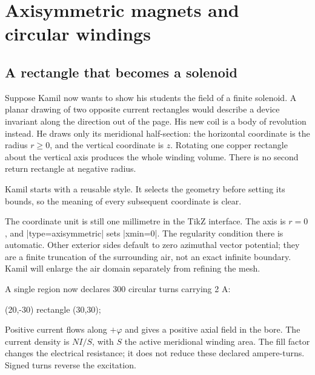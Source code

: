 \section{Axisymmetric magnets and circular windings}
\label{sec:axisymmetric}

\subsection{A rectangle that becomes a solenoid}
Suppose Kamil now wants to show his students the field of a finite solenoid.
A planar drawing of two opposite current rectangles would describe a device
invariant along the direction out of the page. His new coil is a body of
revolution instead. He draws only its meridional half-section: the horizontal
coordinate is the radius $r\geq0$, and the vertical coordinate is $z$.
Rotating one copper rectangle about the vertical axis produces the whole
winding volume. There is no second return rectangle at negative radius.

Kamil starts with a reusable style. It selects the geometry before setting its
bounds, so the meaning of every subsequent coordinate is clear.
\begin{codeexample}
\end{codeexample}
The coordinate unit is still one millimetre in the TikZ interface. The axis is
$r=0$, and |type=axisymmetric| sets |xmin=0|. The regularity condition there is
automatic. Other exterior sides default to zero azimuthal vector potential;
they are a finite truncation of the surrounding air, not an exact infinite
boundary. Kamil will enlarge the air domain separately from refining the mesh.

A single region now declares 300 circular turns carrying 2 A:
\begin{codeexample}
\filldraw[fill=orange!25,draw=orange!70!black,
  femm/region={material=copper,circuit=coil,turns=300,
    winding fill=.6,mesh size=1}]
  (20,-30) rectangle (30,30);
\end{codeexample}
Positive current flows along $+\varphi$ and gives a positive axial field in the
bore. The current density is $NI/S$, with $S$ the active meridional winding
area. The fill factor changes the electrical resistance; it does not reduce
these declared ampere-turns. Signed turns reverse the excitation.

